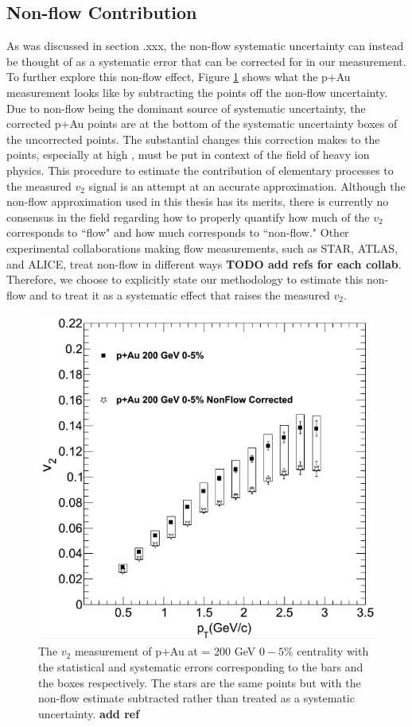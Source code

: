 \subsection{Non-flow Contribution}
As was discussed in section .xxx, the non-flow systematic uncertainty can instead be thought of as a systematic error that can be corrected for in our measurement. To further explore this non-flow effect, Figure \ref{fig:pau_points_alone_nf} shows what the p+Au measurement looks like by subtracting the points off the non-flow uncertainty. Due to non-flow being the dominant source of systematic uncertainty, the corrected p+Au points are at the bottom of the systematic uncertainty boxes of the uncorrected points.  The substantial changes this correction makes to the \pau points, especially at high \pt, must be put in context of the field of heavy ion physics. This procedure to estimate the contribution of elementary processes to the measured $v_2$ signal is an attempt at an accurate approximation. Although the non-flow approximation used in this thesis has its merits, there is currently no consensus in the field regarding how to properly quantify how much of the $v_2$ corresponds to ``flow" and how much corresponds to ``non-flow." Other experimental collaborations making flow measurements, such as STAR, ATLAS, and ALICE, treat non-flow in different ways \textbf{TODO add refs for each collab}. Therefore, we choose to explicitly state our methodology to estimate this non-flow and to treat it as a systematic effect that raises the measured $v_2$. %

\begin{figure}[!ht]
\begin{center}
\includegraphics[width=0.65\linewidth]{figs/figure_w_nonflow_corr.png}
\caption{The $v_2$ measurement of p+Au at \sqsn =  200 GeV $0-5\%$ centrality with the statistical and systematic errors corresponding to the bars and the boxes respectively. The stars are the same \pau points but with the non-flow estimate subtracted rather than treated as a systematic uncertainty. \textbf{add ref}}
\label{fig:pau_points_alone_nf}
\end{center}
\end{figure}

